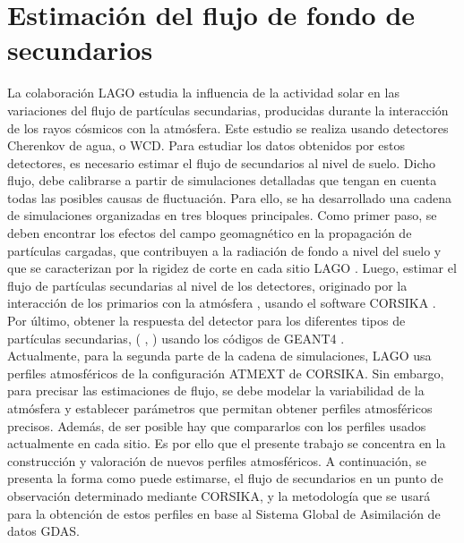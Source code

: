 \newpage
\newpage


\chapter{Estimación del flujo de fondo de secundarios}

\noindent La colaboración LAGO estudia la influencia de la actividad solar en las variaciones del flujo de partículas secundarias, producidas durante la interacción de los rayos cósmicos con la atmósfera. Este estudio se realiza usando detectores Cherenkov de agua, o WCD. Para estudiar los datos obtenidos por estos detectores, es necesario estimar el flujo de secundarios al nivel de suelo. Dicho flujo, debe calibrarse a partir de simulaciones detalladas que tengan en cuenta todas las posibles causas de fluctuación. Para ello, se ha desarrollado una cadena de simulaciones organizadas en tres bloques principales. Como primer paso, se deben  encontrar los efectos del campo geomagnético en la propagación de partículas cargadas, que contribuyen a la radiación de fondo a nivel del suelo y que se caracterizan por la rigidez de corte en cada sitio LAGO  \citep{lagoSW}. Luego, estimar el flujo de partículas secundarias al nivel de los detectores, originado por la interacción de los primarios con la atmósfera \citep{Model}, usando el software CORSIKA  \citep{Heck1998}. Por último, obtener la respuesta del detector para los diferentes tipos de  partículas secundarias, ( \citep{andrei},  \citep{MuTe}) usando los códigos de GEANT4  \citep{GEANT4}.\\

Actualmente, para la segunda parte de la cadena de simulaciones, LAGO usa perfiles atmosféricos de la configuración ATMEXT de CORSIKA. Sin embargo, para precisar las estimaciones de flujo, se debe modelar la variabilidad de la atmósfera y establecer parámetros que permitan obtener perfiles atmosféricos precisos. Además, de ser posible hay que compararlos con los perfiles usados actualmente en cada sitio. Es por ello que el presente trabajo se concentra en la construcción y valoración de nuevos perfiles atmosféricos. A continuación, se presenta la forma como puede estimarse, el flujo de secundarios en un punto de observación determinado mediante CORSIKA, y la metodología que se usará para la obtención de estos perfiles en base al Sistema Global de Asimilación de datos GDAS.\\

